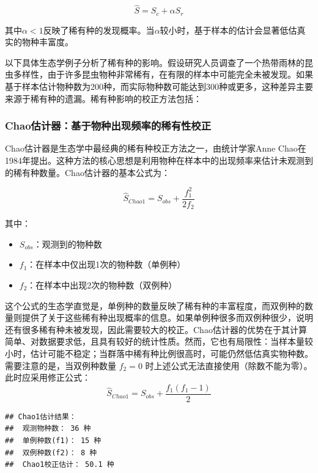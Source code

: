 \documentclass[
  twoside,12pt,fontset=none]{ctexbook}
\providecommand{\tightlist}{%
  \setlength{\itemsep}{0pt}\setlength{\parskip}{0pt}}
\begin{document}
\[\hat{S} = S_c + \alpha S_r\]

其中\(\alpha < 1\)反映了稀有种的发现概率。当\(\alpha\)较小时，基于样本的估计会显著低估真实的物种丰富度。

以下具体生态学例子分析了稀有种的影响。假设研究人员调查了一个热带雨林的昆虫多样性，由于许多昆虫物种非常稀有，在有限的样本中可能完全未被发现。如果基于样本估计物种数为200种，而实际物种数可能达到300种或更多，这种差异主要来源于稀有种的遗漏。稀有种影响的校正方法包括：

\hypertarget{chaoux4f30ux8ba1ux5668ux57faux4e8eux7269ux79cdux51faux73b0ux9891ux7387ux7684ux7a00ux6709ux6027ux6821ux6b63}{%
\subsubsection{Chao估计器：基于物种出现频率的稀有性校正}\label{chaoux4f30ux8ba1ux5668ux57faux4e8eux7269ux79cdux51faux73b0ux9891ux7387ux7684ux7a00ux6709ux6027ux6821ux6b63}}

Chao估计器是生态学中最经典的稀有种校正方法之一，由统计学家Anne Chao在1984年提出。这种方法的核心思想是利用物种在样本中的出现频率来估计未观测到的稀有种数量。Chao估计器的基本公式为：

\[\hat{S}_{Chao1} = S_{obs} + \frac{f_1^2}{2f_2}\]

其中：

\begin{itemize}
\tightlist
\item
  \(S_{obs}\)：观测到的物种数
\item
  \(f_1\)：在样本中仅出现1次的物种数（单例种）
\item
  \(f_2\)：在样本中出现2次的物种数（双例种）
\end{itemize}

这个公式的生态学直觉是，单例种的数量反映了稀有种的丰富程度，而双例种的数量则提供了关于这些稀有种出现概率的信息。如果单例种很多而双例种很少，说明还有很多稀有种未被发现，因此需要较大的校正。Chao估计器的优势在于其计算简单、对数据要求低，且具有较好的统计性质。然而，它也有局限性：当样本量较小时，估计可能不稳定；当群落中稀有种比例很高时，可能仍然低估真实物种数。需要注意的是，当双例种数量 \(f_2 = 0\) 时上述公式无法直接使用（除数不能为零）。此时应采用修正公式：
\[\hat{S}_{Chao1} = S_{obs} + \frac{f_1(f_1-1)}{2}\]

\begin{verbatim}
## Chao1估计结果：
##  观测物种数： 36 种
##  单例种数(f1)： 15 种
##  双例种数(f2)： 8 种
##  Chao1校正估计： 50.1 种
\end{verbatim}
\end{document}
